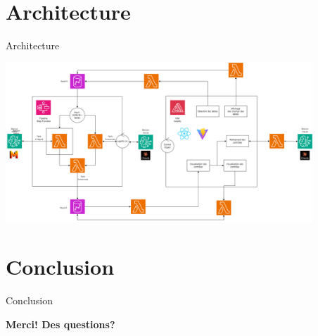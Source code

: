\documentclass{beamer}
\begin{document}
\section{Architecture}
\begin{frame}{Architecture}
	\vspace*{-1.5cm}
	\begin{center}
	\includegraphics[height=6cm]{archi_AWS.drawio.png}
	\end{center}
\end{frame}



\section{Conclusion}
\begin{frame}{Conclusion}
	\begin{center}
	\textbf{Merci! Des questions?}
	\end{center}
\end{frame}
\end{document}
